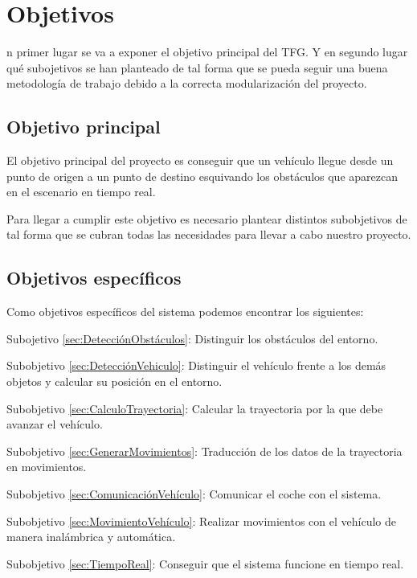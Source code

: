 \chapter{Objetivos}
\label{chap:objetivos}

n primer lugar se va a exponer el objetivo principal del \ac{TFG}. Y en segundo lugar qué subojetivos se han planteado de tal forma que se pueda seguir una buena metodología de trabajo debido a la correcta modularización del proyecto. 

\section{Objetivo principal}\label{ObjetivoPrincipal}

El objetivo principal del proyecto es conseguir que un vehículo llegue desde un punto de origen a un punto de destino esquivando los obstáculos que aparezcan en el escenario en tiempo real.

Para llegar a cumplir este objetivo es necesario plantear distintos subobjetivos de tal forma que se cubran todas las necesidades para llevar a cabo nuestro proyecto.

\section{Objetivos específicos}\label{ObjetivosEspecíficos}

Como objetivos específicos del sistema podemos encontrar los siguientes:

\begin{definitionlist}
\item[Subojetivo \ref{sec:DetecciónObstáculos}: \nameref{sec:DetecciónObstáculos}] Distinguir los obstáculos del entorno.
\item[Subobjetivo \ref{sec:DetecciónVehiculo}: \nameref{sec:DetecciónVehiculo}] Distinguir el vehículo frente a los demás objetos y calcular su posición en el entorno.
\item[Subobjetivo \ref{sec:CalculoTrayectoria}: \nameref{sec:CalculoTrayectoria}] Calcular la trayectoria por la que debe avanzar el vehículo.
\item[Subobjetivo \ref{sec:GenerarMovimientos}: \nameref{sec:GenerarMovimientos}] Traducción de los datos de la trayectoria en movimientos.
\item[Subobjetivo \ref{sec:ComunicaciónVehículo}: \nameref{sec:ComunicaciónVehículo}] Comunicar el coche con el sistema.
\item[Subobjetivo \ref{sec:MovimientoVehículo}: \nameref{sec:MovimientoVehículo}] Realizar movimientos con el vehículo de manera inalámbrica y automática.
\item[Subobjetivo \ref{sec:TiempoReal}: \nameref{sec:TiempoReal}] Conseguir que el sistema funcione en tiempo real.
\end{definitionlist}

